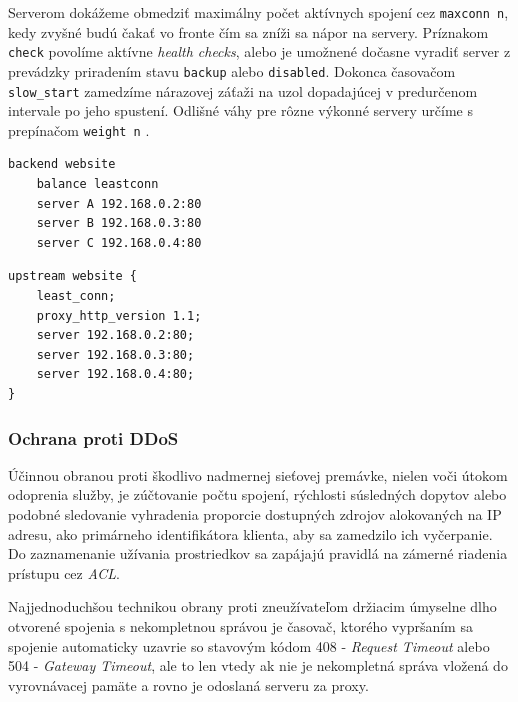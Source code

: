 \documentclass[12pt, a4paper]{article}
\begin{document}
Serverom dokážeme obmedziť maximálny počet aktívnych spojení cez \verb|maxconn n|, kedy zvyšné budú čakať
vo fronte čím sa zníži sa nápor na servery. Príznakom \verb|check| povolíme
aktívne \emph{health checks}, alebo je umožnené dočasne vyradiť server z prevádzky priradením 
stavu \verb|backup| alebo \verb|disabled|. Dokonca časovačom \verb|slow_start| zamedzíme nárazovej záťaži
na uzol dopadajúcej v predurčenom intervale po jeho spustení.  Odlišné váhy pre rôzne výkonné servery 
určíme s prepínačom \verb|weight n| \cite{haproxy-docs}.

\noindent\begin{minipage}{.48\textwidth}
\begin{lstlisting}[caption=HAProxy:  vyvažovanie záťaže najmenej spojení na trojicu HTTP serverov]
backend website
    balance leastconn
    server A 192.168.0.2:80
    server B 192.168.0.3:80
    server C 192.168.0.4:80
\end{lstlisting}
\end{minipage}\hfill
\begin{minipage}{.48\textwidth}
\begin{lstlisting}[caption=NGINX: vyvažovanie záťaže najmenej spojení na trojicu HTTP serverov]
upstream website {
    least_conn;
    proxy_http_version 1.1;
    server 192.168.0.2:80;
    server 192.168.0.3:80;
    server 192.168.0.4:80;
}
\end{lstlisting}
\end{minipage}

\subsubsection{Ochrana proti DDoS}
Účinnou obranou proti škodlivo nadmernej sieťovej premávke, nielen voči útokom odoprenia služby, je 
zúčtovanie počtu spojení, rýchlosti súsledných dopytov alebo podobné sledovanie vyhradenia proporcie
dostupných zdrojov alokovaných na IP adresu, ako primárneho identifikátora klienta, aby
sa zamedzilo ich vyčerpanie. Do zaznamenanie užívania prostriedkov sa zapájajú pravidlá na zámerné
riadenia prístupu cez \emph{ACL}. 

Najjednoduchšou technikou obrany proti zneužívateľom držiacim úmyselne  dlho otvorené spojenia s 
nekompletnou správou je časovač, ktorého vypršaním sa spojenie automaticky uzavrie so stavovým kódom 408 - 
\emph{Request Timeout} alebo 504 - \emph{Gateway Timeout}, ale to len vtedy ak nie je nekompletná správa 
vložená do vyrovnávacej pamäte a rovno je odoslaná serveru za proxy.
\end{document}
